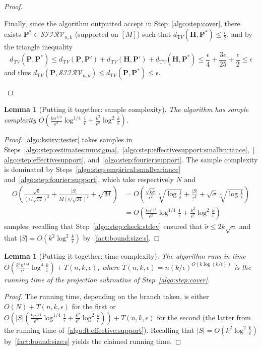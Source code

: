\documentclass[11pt]{article}
\newtheorem{lemma}[theorem]{Lemma}
\theoremstyle{definition}
\newcommand{\p}{\mathbf{P}}
\newcommand{\h}{\mathbf{H}}
\newcommand{\dtv}{d_{\mathrm TV}}
\newcommand{\eps}{\epsilon}
\newcommand{\abs}[1]{\lvert#1\rvert}
\renewcommand{\abs}[1]{\left\lvert #1 \right\rvert}
\newcommand{\accept}{\textsf{accept}\xspace}
\newcommand{\bigO}[1]{{O\left( #1 \right)}}
\newcommand{\classksiirv}[2][n]{\ensuremath{\mathcal{SIIRV}_{#1,#2}}\xspace}
\begin{document}
\begin{proof}
\begin{itemize}
  Finally, since the algorithm outputted \accept in Step~\ref{algo:step:cover}, there exists $\p^\ast\in\classksiirv[n]{k}$ (supported on $[M]$) such that $\dtv(\h,\p^\ast)\leq \frac{\eps}{2}$, and by the triangle inequality
  \[
      \dtv(\p,\p^\ast) \leq \dtv(\p,\p') + \dtv(\h,\p') + \dtv(\h,\p^\ast) \leq \frac{\eps}{4} + \frac{3\eps}{25} + \frac{\eps}{2} \leq \eps
  \]
  and thus $\dtv(\p,\classksiirv[n]{k}) \leq \dtv(\p,\p^\ast) \leq \eps$.
 \end{itemize}
\end{proof}

\begin{lemma}[Putting it together: sample complexity]\label{lemma:sample:complexity}
  The algorithm has sample complexity $O\left( \frac{k n^{1/4}}{\eps^2}\log^{1/4}\frac{1}{\eps} + \frac{k^2}{\eps^2} \log^2\frac{k}{\eps} \right)$.
\end{lemma}
\begin{proof}  \cref{algo:ksiirv:tester} takes samples in Steps~\ref{algo:step:estimates:mu:sigma},~\ref{algo:step:effectivesupport:smallvariance},~\ref{algo:step:effectivesupport}, and~\ref{algo:step:fourier:support}. The sample complexity is dominated by Steps~\ref{algo:step:empirical:smallvariance} and~\ref{algo:step:fourier:support}, which take respectively $N$ and 
  \begin{align*}
    O\left( \frac{\sqrt{b}}{(\eps/\sqrt{M})^2} + \frac{\abs{S}}{M(\eps/\sqrt{M})^2} + \sqrt{M} \right) 
    &= O\left( \frac{\sqrt{k \widetilde{\sigma}}}{\eps^2}\sqrt[4]{\log\frac{1}{\eps}} 
        + \frac{\abs{S}}{\eps^2}
        + \sqrt{\widetilde{\sigma}}\sqrt[4]{\log\frac{1}{\eps}} \right)
    \\
    &= O\left( \frac{k n^{1/4}}{\eps^2}\log^{1/4}\frac{1}{\eps} + \frac{k^2}{\eps^2}\log^2\frac{k}{\eps} \right)
  \end{align*}
  samples; recalling that Step~\ref{algo:step:check:stdev} ensured that $\widetilde{\sigma} \leq 2k\sqrt{n}$ and that $\abs{S}=\bigO{k^2\log^2\frac{k}{\eps}}$ by~\cref{fact:bound:size:s}.
\end{proof}


\begin{lemma}[Putting it together: time complexity]\label{lemma:running:time}
  The algorithm runs in time $\bigO{ \frac{k^4n^{1/4}}{\eps^2}\log^{4}\frac{k}{\eps} } + T(n,k,\eps)$, where $T(n,k,\eps)=n(k/\eps)^{\bigO{k\log(k/\eps)}}$ is the running time of the projection subroutine of Step~\ref{algo:step:cover}.
\end{lemma}
\begin{proof}  The running time, depending on the branch taken, is either $O(N)+T(n,k,\eps)$ for the first or $O\left( \abs{S}\left(\frac{k n^{1/4}}{\eps^2}\log^{1/4}\frac{1}{\eps} + \frac{k^2}{\eps^2}\log^2\frac{k}{\eps}\right) \right)+T(n,k,\eps)$ for the second (the latter from the running time of~\cref{algo:ft:effective:support}). Recalling that $\abs{S}=\bigO{k^2\log^2\frac{k}{\eps}}$ by~\cref{fact:bound:size:s} yields the claimed running time.
\end{proof}
\end{document}
